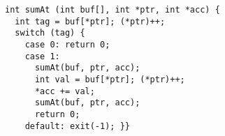 \begin{lstlisting}
int sumAt (int buf[], int *ptr, int *acc) {
  int tag = buf[*ptr]; (*ptr)++;
  switch (tag) {
    case 0: return 0;
    case 1:
      sumAt(buf, ptr, acc);
      int val = buf[*ptr]; (*ptr)++;
      *acc += val;
      sumAt(buf, ptr, acc);
      return 0;
    default: exit(-1); }}
\end{lstlisting}
